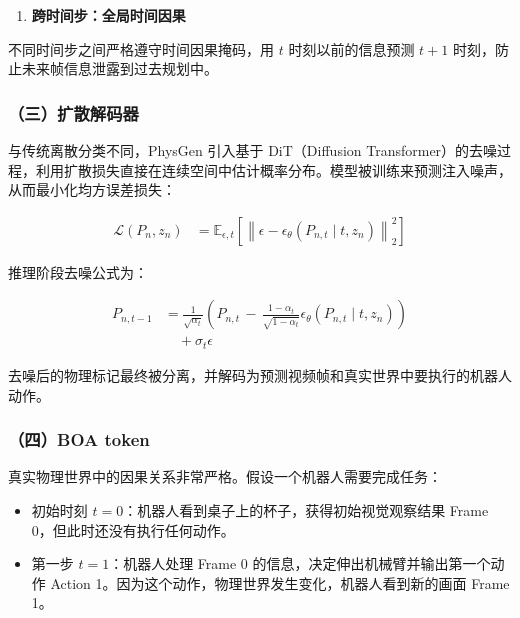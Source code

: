 \begin{enumerate}
\def\labelenumi{\arabic{enumi}.}
\setcounter{enumi}{3}
\tightlist
\item
  \textbf{跨时间步：全局时间因果}
\end{enumerate}

不同时间步之间严格遵守时间因果掩码，用 \(t\) 时刻以前的信息预测 \(t+1\) 时刻，防止未来帧信息泄露到过去规划中。

\hypertarget{ux4e09ux6269ux6563ux89e3ux7801ux5668}{%
\subsubsection{（三）扩散解码器}\label{ux4e09ux6269ux6563ux89e3ux7801ux5668}}

与传统离散分类不同，PhysGen 引入基于 DiT（Diffusion Transformer）的去噪过程，利用扩散损失直接在连续空间中估计概率分布。模型被训练来预测注入噪声，从而最小化均方误差损失：

\[
\begin{aligned}
\mathcal{L}(P_n, z_n)
&= \mathbb{E}_{\epsilon,t}
\left[
\left\|
\epsilon - \epsilon_\theta(P_{n,t}\mid t,z_n)
\right\|_2^2
\right]
\end{aligned}
\]

推理阶段去噪公式为：

\[
\begin{aligned}
P_{n,t-1}
&=
\frac{1}{\sqrt{\alpha_t}}
\left(
P_{n,t}
\, - \, \frac{1-\alpha_t}{\sqrt{1-\bar{\alpha}_t}}
\epsilon_\theta(P_{n,t}\mid t,z_n)
\right)
\\
&\quad + \sigma_t \epsilon
\end{aligned}
\]

去噪后的物理标记最终被分离，并解码为预测视频帧和真实世界中要执行的机器人动作。

\hypertarget{ux56dbboa-token}{%
\subsubsection{（四）BOA token}\label{ux56dbboa-token}}

真实物理世界中的因果关系非常严格。假设一个机器人需要完成任务：

\begin{itemize}
\tightlist
\item
  初始时刻 \(t=0\)：机器人看到桌子上的杯子，获得初始视觉观察结果 Frame 0，但此时还没有执行任何动作。
\item
  第一步 \(t=1\)：机器人处理 Frame 0 的信息，决定伸出机械臂并输出第一个动作 Action 1。因为这个动作，物理世界发生变化，机器人看到新的画面 Frame 1。
\end{itemize}

